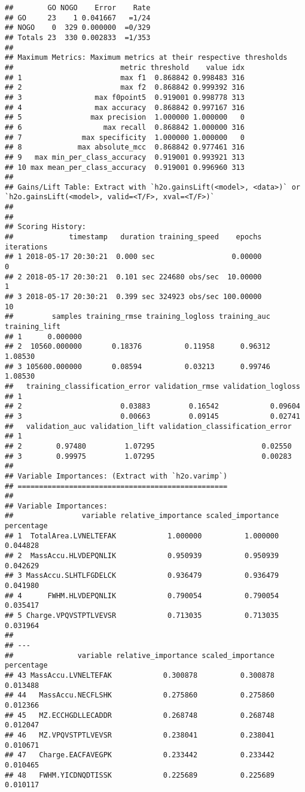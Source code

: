 \documentclass[]{article}
\begin{document}
\begin{verbatim}
##        GO NOGO    Error    Rate
## GO     23    1 0.041667   =1/24
## NOGO    0  329 0.000000  =0/329
## Totals 23  330 0.002833  =1/353
## 
## Maximum Metrics: Maximum metrics at their respective thresholds
##                         metric threshold    value idx
## 1                       max f1  0.868842 0.998483 316
## 2                       max f2  0.868842 0.999392 316
## 3                 max f0point5  0.919001 0.998778 313
## 4                 max accuracy  0.868842 0.997167 316
## 5                max precision  1.000000 1.000000   0
## 6                   max recall  0.868842 1.000000 316
## 7              max specificity  1.000000 1.000000   0
## 8             max absolute_mcc  0.868842 0.977461 316
## 9   max min_per_class_accuracy  0.919001 0.993921 313
## 10 max mean_per_class_accuracy  0.919001 0.996960 313
## 
## Gains/Lift Table: Extract with `h2o.gainsLift(<model>, <data>)` or `h2o.gainsLift(<model>, valid=<T/F>, xval=<T/F>)`
## 
## 
## Scoring History: 
##             timestamp   duration training_speed    epochs iterations
## 1 2018-05-17 20:30:21  0.000 sec                  0.00000          0
## 2 2018-05-17 20:30:21  0.101 sec 224680 obs/sec  10.00000          1
## 3 2018-05-17 20:30:21  0.399 sec 324923 obs/sec 100.00000         10
##         samples training_rmse training_logloss training_auc training_lift
## 1      0.000000                                                          
## 2  10560.000000       0.18376          0.11958      0.96312       1.08530
## 3 105600.000000       0.08594          0.03213      0.99746       1.08530
##   training_classification_error validation_rmse validation_logloss
## 1                                                                 
## 2                       0.03883         0.16542            0.09604
## 3                       0.00663         0.09145            0.02741
##   validation_auc validation_lift validation_classification_error
## 1                                                               
## 2        0.97480         1.07295                         0.02550
## 3        0.99975         1.07295                         0.00283
## 
## Variable Importances: (Extract with `h2o.varimp`) 
## =================================================
## 
## Variable Importances: 
##                variable relative_importance scaled_importance percentage
## 1  TotalArea.LVNELTEFAK            1.000000          1.000000   0.044828
## 2  MassAccu.HLVDEPQNLIK            0.950939          0.950939   0.042629
## 3 MassAccu.SLHTLFGDELCK            0.936479          0.936479   0.041980
## 4      FWHM.HLVDEPQNLIK            0.790054          0.790054   0.035417
## 5 Charge.VPQVSTPTLVEVSR            0.713035          0.713035   0.031964
## 
## ---
##               variable relative_importance scaled_importance percentage
## 43 MassAccu.LVNELTEFAK            0.300878          0.300878   0.013488
## 44   MassAccu.NECFLSHK            0.275860          0.275860   0.012366
## 45   MZ.ECCHGDLLECADDR            0.268748          0.268748   0.012047
## 46   MZ.VPQVSTPTLVEVSR            0.238041          0.238041   0.010671
## 47   Charge.EACFAVEGPK            0.233442          0.233442   0.010465
## 48   FWHM.YICDNQDTISSK            0.225689          0.225689   0.010117
\end{verbatim}
\end{document}
